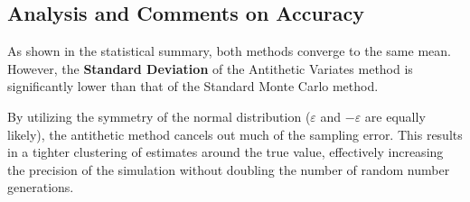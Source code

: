\subsection{Analysis and Comments on Accuracy}
As shown in the statistical summary, both methods converge to the same mean. However, the \textbf{Standard Deviation} of the Antithetic Variates method is significantly lower than that of the Standard Monte Carlo method. 

By utilizing the symmetry of the normal distribution ($\varepsilon$ and $-\varepsilon$ are equally likely), the antithetic method cancels out much of the sampling error. This results in a tighter clustering of estimates around the true value, effectively increasing the precision of the simulation without doubling the number of random number generations.